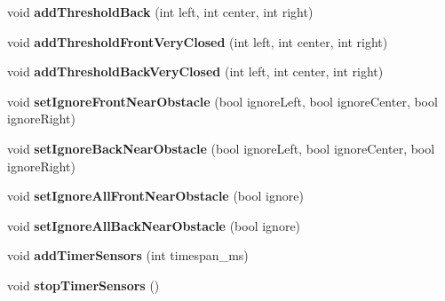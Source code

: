 \begin{DoxyCompactItemize}
void {\bfseries add\+Threshold\+Back} (int left, int center, int right)
\item 
\mbox{\label{classSensors_ab397d8739ebfe2f57290ddd97dc81efc}} 
void {\bfseries add\+Threshold\+Front\+Very\+Closed} (int left, int center, int right)
\item 
\mbox{\label{classSensors_ae46b261ea00e7407fd61e5c70f4c431e}} 
void {\bfseries add\+Threshold\+Back\+Very\+Closed} (int left, int center, int right)
\item 
\mbox{\label{classSensors_aa272452c512e68bbe801ae7010a84a38}} 
void {\bfseries set\+Ignore\+Front\+Near\+Obstacle} (bool ignore\+Left, bool ignore\+Center, bool ignore\+Right)
\item 
\mbox{\label{classSensors_a1f98ef29b4b9b5607aa154ccf493303a}} 
void {\bfseries set\+Ignore\+Back\+Near\+Obstacle} (bool ignore\+Left, bool ignore\+Center, bool ignore\+Right)
\item 
\mbox{\label{classSensors_a12662045561c34eac5055c5819041f3a}} 
void {\bfseries set\+Ignore\+All\+Front\+Near\+Obstacle} (bool ignore)
\item 
\mbox{\label{classSensors_a2a1a388e492a76281a0b743c33c3f47b}} 
void {\bfseries set\+Ignore\+All\+Back\+Near\+Obstacle} (bool ignore)
\item 
\mbox{\label{classSensors_a1ef07aeea0536ccf34e310d831e71ef0}} 
void {\bfseries add\+Timer\+Sensors} (int timespan\+\_\+ms)
\item 
\mbox{\label{classSensors_a85be8662515c22a100f45c4ed417fe8d}} 
void {\bfseries stop\+Timer\+Sensors} ()
\end{DoxyCompactItemize}
